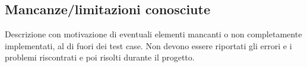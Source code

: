 \documentclass[../main.tex]{subfiles}
\begin{document}
\subsection{Mancanze/limitazioni conosciute}
Descrizione con motivazione di eventuali elementi mancanti o non
completamente implementati, al di fuori dei test case. Non devono essere
riportati gli errori e i problemi riscontrati e poi risolti durante il
progetto.
\end{document}
